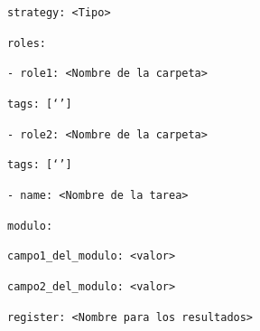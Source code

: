 \documentclass[11pt]{article}
\begin{document}
\begin{flushleft}
\begin{center}
\begin{minipage}{.4\textwidth}
                \hspace{2.2mm}
                \texttt{strategy: <Tipo>}
                
                \hspace{2.2mm}
                \texttt{roles:}
            
                    \hspace{4.2mm}
                    \texttt{- role1: <Nombre de la carpeta>}
            
                    \hspace{7.3mm}
                    \texttt{tags: [`']}
            
                    \skip
            
                    \hspace{4.2mm}
                    \texttt{- role2: <Nombre de la carpeta>}
            
                    \hspace{7.3mm}
                    \texttt{tags: [`']}
            
                \label{formato_play}
            \end{minipage}%
            \hspace{1.5cm}
            \begin{minipage}{.4\textwidth}
                \footnotesize
                \texttt{- name: <Nombre de la tarea>} 
            
                \hspace{2.2mm}
                \texttt{modulo:} 
            
                    \hspace{5mm}
                    \texttt{campo1\_del\_modulo: <valor>}
                
                    \hspace{5mm}
                    \texttt{campo2\_del\_modulo: <valor>}
            
                \hspace{2.2mm}
                \texttt{register: <Nombre para los resultados>}    
        
                \vspace{2.8cm}
            \end{minipage}
        \end{center}
        \bigskip
        \bigskip
        

\end{flushleft}
\end{document}
